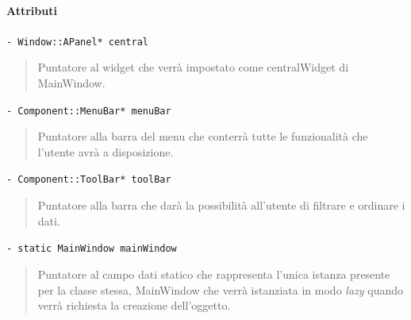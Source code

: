 \paragraph{\color{black}Attributi \\}
\color{teal}\verb!- Window::APanel* central!
\begin{quote}
\color{black}Puntatore al widget che verrà impostato come centralWidget di MainWindow.
\end{quote} 
\color{teal}\verb!- Component::MenuBar* menuBar!
\begin{quote}
\color{black}Puntatore alla barra del menu che conterrà tutte le funzionalità che l'utente avrà a disposizione.
\end{quote} 
\color{teal}\verb!- Component::ToolBar* toolBar!
\begin{quote}
\color{black} Puntatore alla barra che darà la possibilità all'utente di filtrare e ordinare i dati. 
\end{quote} 
\color{teal}\verb!- static MainWindow mainWindow!
\begin{quote}
\color{black} Puntatore al campo dati statico che rappresenta l'unica istanza presente per la classe stessa, MainWindow che verrà istanziata in modo \emph{lazy} quando verrà richiesta la creazione dell'oggetto. 
\end{quote} 
